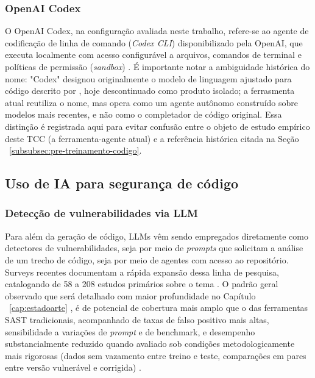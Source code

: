 \subsubsection{OpenAI Codex}\label{subsubsec:openai-codex}
O OpenAI Codex, na configuração avaliada neste trabalho, refere-se ao agente de codificação de linha de comando (\textit{Codex CLI}) disponibilizado pela OpenAI, que executa localmente com acesso configurável a arquivos, comandos de terminal e políticas de permissão (\textit{sandbox}) \cite{OpenAI2025CodexDocs}. É importante notar a ambiguidade histórica do nome: "Codex" designou originalmente o modelo de linguagem ajustado para código descrito por , hoje descontinuado como produto isolado; a ferrasmenta atual reutiliza o nome, mas opera como um agente autônomo construído sobre modelos mais recentes, e não como o completador de código original. Essa distinção é registrada aqui para evitar confusão entre o objeto de estudo empírico deste TCC (a ferramenta-agente atual) e a referência histórica citada na Seção ~\ref{subsubsec:pre-treinamento-codigo}.


\subsection{Uso de IA para segurança de código}\label{subsec:ia-seguranca-codigo}
\subsubsection{Detecção de vulnerabilidades via LLM}\label{subsubsec:deteccao-llm}
Para além da geração de código, LLMs vêm sendo empregados diretamente como detectores de vulnerabilidades, seja por meio de \textit{prompts} que solicitam a análise de um trecho de código, seja por meio de agentes com acesso ao repositório. Surveys recentes documentam a rápida expansão dessa linha de pesquisa, catalogando de 58 a 208 estudos primários sobre o tema \cite{Sheng2025LLMSurvey, Zhou2025LLMReview, Germano2025LLMSLR}. O padrão geral observado que será detalhado com maior profundidade no Capítulo ~\ref{cap:estadoarte} , é de potencial de cobertura mais amplo que o das ferramentas SAST tradicionais, acompanhado de taxas de falso positivo mais altas, sensibilidade a variações de \textit{prompt} e de benchmark, e desempenho substancialmente reduzido quando avaliado sob condições metodologicamente mais rigorosas (dados sem vazamento entre treino e teste, comparações em pares entre versão vulnerável e corrigida) \cite{Ding2025CodeLMVuln, Khare2025LLMEffectiveness}.

